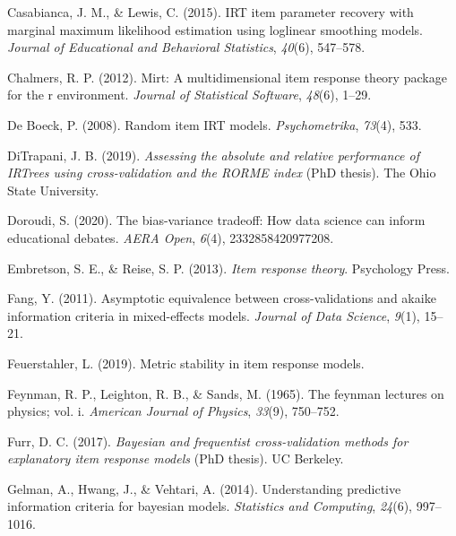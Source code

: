 \documentclass[
  english,
  man,floatsintext]{apa7}
\newlength{\cslhangindent}
\newlength{\cslentryspacingunit} %
\newenvironment{CSLReferences}[2] %
 {%
  \setlength{\parindent}{0pt}
  \ifodd #1
  \let\oldpar\par
  \def\par{\hangindent=\cslhangindent\oldpar}
  \fi
  \setlength{\parskip}{#2\cslentryspacingunit}
 }%
 {}
\begin{document}
\begin{CSLReferences}{1}{0}
\leavevmode{}%
Casabianca, J. M., \& Lewis, C. (2015). IRT item parameter recovery with marginal maximum likelihood estimation using loglinear smoothing models. \emph{Journal of Educational and Behavioral Statistics}, \emph{40}(6), 547--578.

\leavevmode{}%
Chalmers, R. P. (2012). Mirt: A multidimensional item response theory package for the r environment. \emph{Journal of Statistical Software}, \emph{48}(6), 1--29.

\leavevmode{}%
De Boeck, P. (2008). Random item IRT models. \emph{Psychometrika}, \emph{73}(4), 533.

\leavevmode{}%
DiTrapani, J. B. (2019). \emph{Assessing the absolute and relative performance of IRTrees using cross-validation and the RORME index} (PhD thesis). The Ohio State University.

\leavevmode{}%
Doroudi, S. (2020). The bias-variance tradeoff: How data science can inform educational debates. \emph{AERA Open}, \emph{6}(4), 2332858420977208.

\leavevmode{}%
Embretson, S. E., \& Reise, S. P. (2013). \emph{Item response theory}. Psychology Press.

\leavevmode{}%
Fang, Y. (2011). Asymptotic equivalence between cross-validations and akaike information criteria in mixed-effects models. \emph{Journal of Data Science}, \emph{9}(1), 15--21.

\leavevmode{}%
Feuerstahler, L. (2019). Metric stability in item response models.

\leavevmode{}%
Feynman, R. P., Leighton, R. B., \& Sands, M. (1965). The feynman lectures on physics; vol. i. \emph{American Journal of Physics}, \emph{33}(9), 750--752.

\leavevmode{}%
Furr, D. C. (2017). \emph{Bayesian and frequentist cross-validation methods for explanatory item response models} (PhD thesis). UC Berkeley.

\leavevmode{}%
Gelman, A., Hwang, J., \& Vehtari, A. (2014). Understanding predictive information criteria for bayesian models. \emph{Statistics and Computing}, \emph{24}(6), 997--1016.


\end{CSLReferences}
\end{document}
